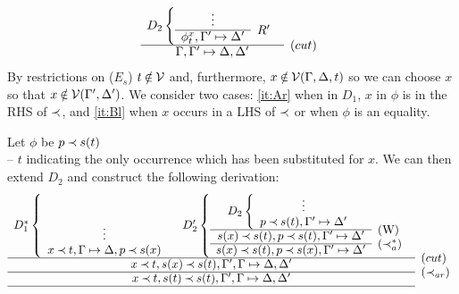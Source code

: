 \begin{PROOF}
\[\begin{array}{cl}
 D_2\left\{ \begin{array}{cl}
  \vdots \\ \cline{1-1}  \phi_t^x, \Gamma'\Seq\Delta' & \raisebox{1.2ex}[1.5ex][0ex]{$R'$}
 \end{array} \right. \\ \cline{1-1}
\Gamma,\Gamma' \Seq \Delta,\Delta'
&   \raisebox{1.2ex}[1.5ex][0ex]{($cut$)}
\end{array} \]
%
By restrictions on ($E_s$) $t\not\in\Vars$ and, furthermore, 
$x\not\in\C V(\Gamma,\Delta,t)$ so we can choose
 $x$ so that $x\not\in\C V(\Gamma',\Delta')$. We consider two cases: \ref{it:Ar} when
in $D_1$, $x$ in $\phi$ is in the RHS of $\mathbin{\prec}$, 
and \ref{it:Bl} when $x$ occurs in
a LHS of $\mathbin{\prec}$ or when $\phi$ is an equality. 
\begin{LS}
%
%
\item\label{it:Ar} Let $\phi$ be $p\mathbin{\prec} s(t)$  \\[.5ex]
\noindent
-- $t$ indicating the only occurrence
which has been substituted for $x$. We can then 
extend $D_2$ and construct the following derivation:
%
\[
 \begin{array}{cl}
 D_1^*\left\{ \begin{array}{cl}
  \ \\ \ \\ \vdots \\ 
  x\Incl t,\Gamma\Seq\Delta, p\Incl s(x) 
         \end{array} \right. \ \ \ 
%
D'_2\left\{ \begin{array}{cl}
  D_2\left\{ \begin{array}{cl}
  \vdots \\ 
  p\Incl s(t),\Gamma'\Seq\Delta' \end{array} \right.  \\ \cline{1-1}
 s(x)\Incl s(t),p\Incl s(t),\Gamma'\Seq\Delta' 
   & \raisebox{1.2ex}[1.5ex][0ex]{(W)} \\ \cline{1-1}
s(x)\Incl s(t), p\Incl s(x),\Gamma'\Seq\Delta' 
& \raisebox{1.2ex}[1.5ex][0ex]{($\Incl_a^*$)}
         \end{array} \right.
%
\\ \cline{1-1}
x\Incl t, s(x)\Incl s(t), \Gamma',\GSD,\Delta' 
  & \raisebox{1.2ex}[1.5ex][0ex]{($cut$)} \\ \cline{1-1}
x\Incl t, s(t)\Incl s(t), \Gamma',\GSD,\Delta' 
  & \raisebox{1.2ex}[1.5ex][0ex]{($\Incl_{ar}$)} \\ \cline{1-1}

\end{array}\]
\end{LS}
\end{PROOF}
